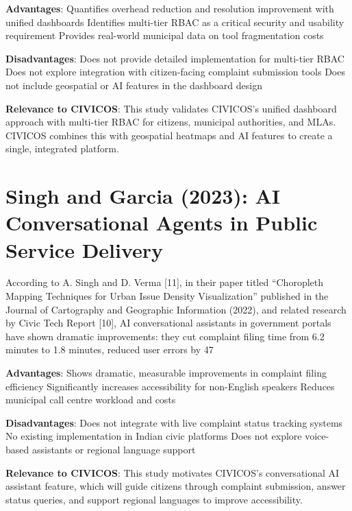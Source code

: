 \documentclass[12pt,a4paper]{report}
\begin{document}
\textbf{Advantages}:
Quantifies overhead reduction and resolution improvement with unified dashboards
Identifies multi-tier RBAC as a critical security and usability requirement
Provides real-world municipal data on tool fragmentation costs

\textbf{Disadvantages}:
Does not provide detailed implementation for multi-tier RBAC
Does not explore integration with citizen-facing complaint submission tools
Does not include geospatial or AI features in the dashboard design

\textbf{Relevance to CIVICOS}: This study validates CIVICOS’s unified dashboard approach with multi-tier RBAC for citizens, municipal authorities, and MLAs. CIVICOS combines this with geospatial heatmaps and AI features to create a single, integrated platform.

\section{Singh and Garcia (2023): AI Conversational Agents in Public Service Delivery}

According to A. Singh and D. Verma [11], in their paper titled “Choropleth Mapping Techniques for Urban Issue Density Visualization” published in the Journal of Cartography and Geographic Information (2022), and related research by Civic Tech Report [10], AI conversational assistants in government portals have shown dramatic improvements: they cut complaint filing time from 6.2 minutes to 1.8 minutes, reduced user errors by 47%

\textbf{Advantages}:
Shows dramatic, measurable improvements in complaint filing efficiency
Significantly increases accessibility for non-English speakers
Reduces municipal call centre workload and costs

\textbf{Disadvantages}:
Does not integrate with live complaint status tracking systems
No existing implementation in Indian civic platforms
Does not explore voice-based assistants or regional language support

\textbf{Relevance to CIVICOS}: This study motivates CIVICOS’s conversational AI assistant feature, which will guide citizens through complaint submission, answer status queries, and support regional languages to improve accessibility.
\end{document}
